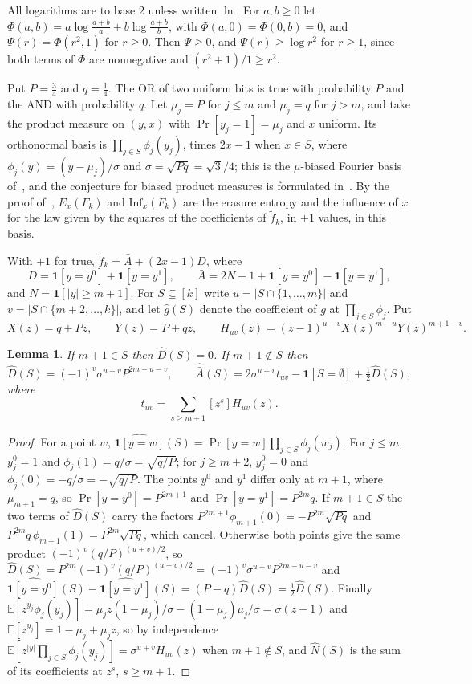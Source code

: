 \documentclass[11pt]{amsart}
\newtheorem{lemma}[theorem]{Lemma}
\theoremstyle{remark}
\newcommand{\Inf}{\mathrm{Inf}}
\newcommand{\E}{\mathbb{E}}
\begin{document}
All logarithms are to base $2$ unless written $\ln$. For $a,b\ge0$ let $\Phi(a,b)=a\log\frac{a+b}{a}+b\log\frac{a+b}{b}$,
with $\Phi(a,0)=\Phi(0,b)=0$, and $\Psi(r)=\Phi(r^2,1)$ for $r\ge0$. Then $\Psi\ge0$, and $\Psi(r)\ge\log r^2$ for
$r\ge1$, since both terms of $\Phi$ are nonnegative and $(r^2+1)/1\ge r^2$.

Put $P=\frac34$ and $q=\frac14$. The OR of two uniform bits is true with probability $P$ and the AND with probability
$q$. Let $\mu_j=P$ for $j\le m$ and $\mu_j=q$ for $j>m$, and take the product measure on $(y,x)$ with
$\Pr[y_j=1]=\mu_j$ and $x$ uniform. Its orthonormal basis is $\prod_{j\in S}\phi_j(y_j)$, times $2x-1$ when $x\in S$,
where $\phi_j(y)=(y-\mu_j)/\sigma$ and $\sigma=\sqrt{Pq}=\sqrt3/4$; this is the $\mu$-biased Fourier basis
of~\cite[Chapter~8]{OD14}, and the conjecture for biased product measures is formulated in~\cite{KMS12}. By the proof
of~\cite[Proposition~12]{Shm8}, $E_x(F_k)$ and $\Inf_x(F_k)$ are the erasure entropy and the influence of $x$ for the
law given by the squares of the coefficients of $\tilde f_k$, in $\pm1$ values, in this basis.

With $+1$ for true, $\tilde f_k=\bar A+(2x-1)D$, where
\[
D=\mathbf 1[y=y^0]+\mathbf 1[y=y^1],\qquad \bar A=2N-1+\mathbf 1[y=y^0]-\mathbf 1[y=y^1],
\]
and $N=\mathbf 1[|y|\ge m+1]$. For $S\subseteq[k]$ write $u=|S\cap\{1,\dots,m\}|$ and $v=|S\cap\{m+2,\dots,k\}|$, and
let $\hat g(S)$ denote the coefficient of $g$ at $\prod_{j\in S}\phi_j$. Put
\[
X(z)=q+Pz,\qquad Y(z)=P+qz,\qquad H_{uv}(z)=(z-1)^{u+v}X(z)^{m-u}Y(z)^{m+1-v}.
\]

\begin{lemma}\label{lem:coef}
If $m+1\in S$ then $\hat D(S)=0$. If $m+1\notin S$ then
\[
\hat D(S)=(-1)^v\sigma^{u+v}P^{2m-u-v},\qquad
\hat{\bar A}(S)=2\sigma^{u+v}t_{uv}-\mathbf 1[S=\emptyset]+\tfrac12\hat D(S),
\]
where
\[
t_{uv}=\sum_{s\ge m+1}[z^s]H_{uv}(z).
\]
\end{lemma}

\begin{proof}
For a point $w$, $\widehat{\mathbf 1[y=w]}(S)=\Pr[y=w]\prod_{j\in S}\phi_j(w_j)$. For $j\le m$, $y^0_j=1$ and
$\phi_j(1)=q/\sigma=\sqrt{q/P}$; for $j\ge m+2$, $y^0_j=0$ and $\phi_j(0)=-q/\sigma=-\sqrt{q/P}$. The points $y^0$
and $y^1$ differ only at $m+1$, where $\mu_{m+1}=q$, so $\Pr[y=y^0]=P^{2m+1}$ and $\Pr[y=y^1]=P^{2m}q$. If $m+1\in S$
the two terms of $\hat D(S)$ carry the factors $P^{2m+1}\phi_{m+1}(0)=-P^{2m}\sqrt{Pq}$ and
$P^{2m}q\,\phi_{m+1}(1)=P^{2m}\sqrt{Pq}$, which cancel. Otherwise both points give the same product
$(-1)^v(q/P)^{(u+v)/2}$, so $\hat D(S)=P^{2m}(-1)^v(q/P)^{(u+v)/2}=(-1)^v\sigma^{u+v}P^{2m-u-v}$ and
$\widehat{\mathbf 1[y=y^0]}(S)-\widehat{\mathbf 1[y=y^1]}(S)=(P-q)\hat D(S)=\frac12\hat D(S)$. Finally
$\E[z^{y_j}\phi_j(y_j)]=\mu_jz(1-\mu_j)/\sigma-(1-\mu_j)\mu_j/\sigma=\sigma(z-1)$ and $\E[z^{y_j}]=1-\mu_j+\mu_jz$, so
by independence $\E[z^{|y|}\prod_{j\in S}\phi_j(y_j)]=\sigma^{u+v}H_{uv}(z)$ when $m+1\notin S$, and $\hat N(S)$ is the
sum of its coefficients at $z^s$, $s\ge m+1$.
\end{proof}
\end{document}
